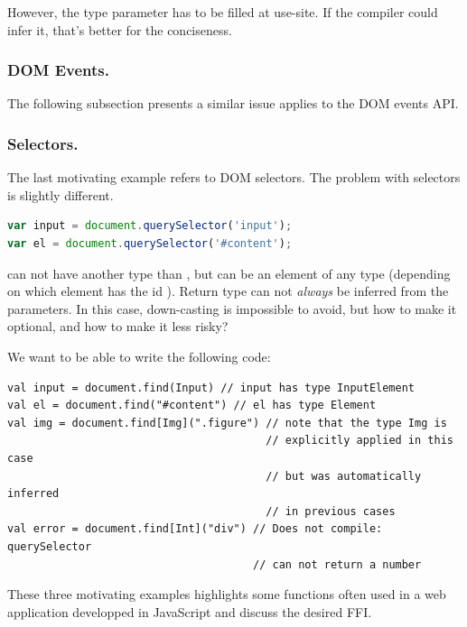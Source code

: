 \documentclass[runningheads,a4paper]{llncs}
\begin{document}
However, the type parameter  has to be filled at use-site. If the compiler could infer it,
that’s better for the conciseness.

\subsubsection{DOM Events.}


The following subsection presents a similar issue applies to the DOM events API.



\subsubsection{Selectors.}

The last motivating example refers to DOM selectors. The problem with selectors is slightly different.

\begin{lstlisting}[language=JavaScript]
var input = document.querySelector('input');
var el = document.querySelector('#content');
\end{lstlisting}

 can not have another type than , but  can be an element of
any type (depending on which element has the id ). Return type can not \emph{always}
be inferred from the parameters. In this case, down-casting is impossible to avoid, but how to make
it optional, and how to make it less risky?

We want to be able to write the following code:

\begin{lstlisting}
val input = document.find(Input) // input has type InputElement
val el = document.find("#content") // el has type Element
val img = document.find[Img](".figure") // note that the type Img is 
                                        // explicitly applied in this case
                                        // but was automatically inferred 
                                        // in previous cases
val error = document.find[Int]("div") // Does not compile: querySelector 
                                      // can not return a number
\end{lstlisting}

These three motivating examples highlights some functions often used in a web application developped in JavaScript and discuss the desired FFI. 

\end{document}

